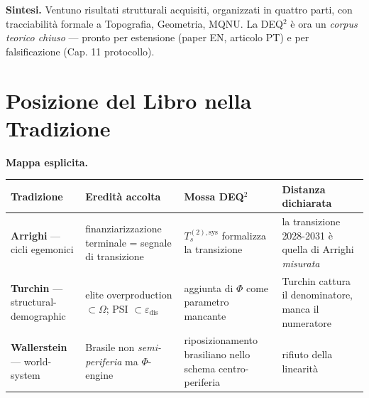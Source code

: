 \Hypoth{} \textbf{Sintesi.} Ventuno risultati strutturali acquisiti,
organizzati in quattro parti, con tracciabilità formale a Topografia,
Geometria, MQNU. La DEQ$^2$ è ora un \emph{corpus teorico chiuso} ---
pronto per estensione (paper EN, articolo PT) e per falsificazione (Cap.
11 protocollo).



\section{Posizione del Libro nella
Tradizione}\label{posizione-del-libro-nella-tradizione}

\Hypoth{} \textbf{Mappa esplicita.}

{\def\LTcaptype{none} %
{\small\begin{longtable}[]{@{}
  >{\raggedright\arraybackslash}p{}
  >{\raggedright\arraybackslash}p{}
  >{\raggedright\arraybackslash}p{}
  >{\raggedright\arraybackslash}p{}@{}}
\toprule\noalign{}
\begin{minipage}[b]{\linewidth}\raggedright
Tradizione
\end{minipage} & \begin{minipage}[b]{\linewidth}\raggedright
Eredità accolta
\end{minipage} & \begin{minipage}[b]{\linewidth}\raggedright
Mossa DEQ$^2$
\end{minipage} & \begin{minipage}[b]{\linewidth}\raggedright
Distanza dichiarata
\end{minipage} \\
\midrule\noalign{}
\endhead
\bottomrule\noalign{}
\endlastfoot
\textbf{Arrighi} --- cicli egemonici & finanziarizzazione terminale =
segnale di transizione & \(T_s^{(2),\text{sys}}\) formalizza la
transizione & la transizione 2028-2031 è quella di Arrighi
\emph{misurata} \\
\textbf{Turchin} --- structural-demographic & elite overproduction
\(\subset \Omega\); PSI \(\subset \varepsilon_{\text{dis}}\) & aggiunta
di \(\Phi\) come parametro mancante & Turchin cattura il denominatore,
manca il numeratore \\
\textbf{Wallerstein} --- world-system & Brasile non
\emph{semi-periferia} ma \(\Phi\)-engine & riposizionamento brasiliano
nello schema centro-periferia & rifiuto della linearità

\end{longtable}}}

